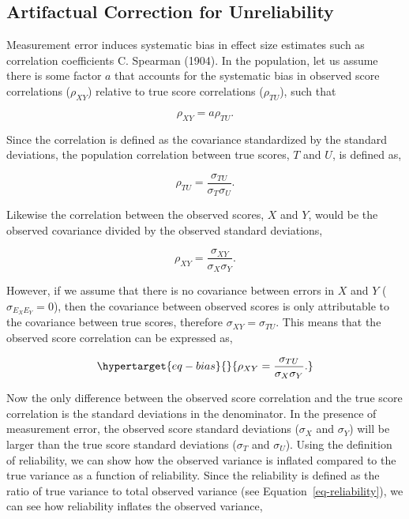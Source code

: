 \documentclass[
  letterpaper,
  DIV=11,
  numbers=noendperiod]{scrreprt}
\begin{document}
\hypertarget{sec-r-corr}{%
\subsection{Artifactual Correction for Unreliability}\label{sec-r-corr}}

Measurement error induces systematic bias in effect size estimates such
as correlation coefficients C. Spearman (1904). In the population, let
us assume there is some factor \(a\) that accounts for the systematic
bias in observed score correlations (\(\rho_{XY}\)) relative to true
score correlations (\(\rho_{TU}\)), such that

\[
\rho_{XY} = a \rho_{TU}.
\]

Since the correlation is defined as the covariance standardized by the
standard deviations, the population correlation between true scores,
\(T\) and \(U\), is defined as,

\[
\rho_{TU}=\frac{\sigma_{TU}}{\sigma_{T} \sigma_{U}}.
\]

Likewise the correlation between the observed scores, \(X\) and \(Y\),
would be the observed covariance divided by the observed standard
deviations,

\[
\rho_{XY} =\frac{\sigma_{XY}}{\sigma_{X} \sigma_{Y}}.
\]

However, if we assume that there is no covariance between errors in
\(X\) and \(Y\) (\(\sigma_{E_X E_Y} = 0\)), then the covariance between
observed scores is only attributable to the covariance between true
scores, therefore \(\sigma_{XY} = \sigma_{TU}\). This means that the
observed score correlation can be expressed as,

\begin{equation}\protect\hypertarget{eq-bias}{}{
\rho_{XY} =\frac{\sigma_{TU}}{\sigma_{X} \sigma_{Y}}.
}\label{eq-bias}\end{equation}

Now the only difference between the observed score correlation and the
true score correlation is the standard deviations in the denominator. In
the presence of measurement error, the observed score standard
deviations (\(\sigma_X\) and \(\sigma_Y\)) will be larger than the true
score standard deviations (\(\sigma_{T}\) and \(\sigma_{U}\)). Using the
definition of reliability, we can show how the observed variance is
inflated compared to the true variance as a function of reliability.
Since the reliability is defined as the ratio of true variance to total
observed variance (see Equation~\ref{eq-reliability}), we can see how
reliability inflates the observed variance,
\end{document}
